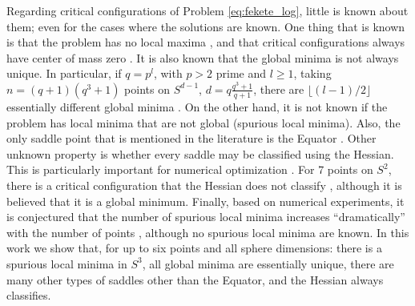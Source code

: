    Regarding critical configurations of Problem \eqref{eq:fekete_log}, little is known about them; even for the cases where the solutions are known.
    One thing that is known is that the problem has no local maxima \cite[Corollary 1.3]{beltran2013}, and that critical configurations always have center of mass zero \cite[Proposition 2]{dragnev2002}.
    It is also known that the global minima is not always unique. In particular, if $q=p^l$, with $p>2$ prime and $l \geq 1$, taking $n=(q+1)(q^3+1)$ points on $S^{d-1}$, $d=q \frac{q^3+1}{q+1}$, there are $\lfloor (l-1)/2 \rfloor$ essentially different global minima \cite[Section 1]{ballinger2009}.
    On the other hand, it is not known if the problem has local minima that are not global (spurious local minima). Also, the only saddle point that is mentioned in the literature is the Equator \cite[Section 2]{shub1993}.
    Other unknown property is whether every saddle may be classified using the Hessian. This is particularly important for numerical optimization \cite{ge2015, jin2017}. For 7 points on $S^2$, there is a critical configuration that the Hessian does not classify \cite[Remark 6.3]{constantineau2023}, although it is believed that it is a global minimum.
    Finally, based on numerical experiments, it is conjectured that the number of spurious local minima increases ``dramatically'' with the number of points \cite[Section 4]{rakhmanov1995}, although no spurious local minima are known.
    In this work we show that, for up to six points and all sphere dimensions: there is a spurious local minima in $S^3$, all global minima are essentially unique, there are many other types of saddles other than the Equator, and the Hessian always classifies.